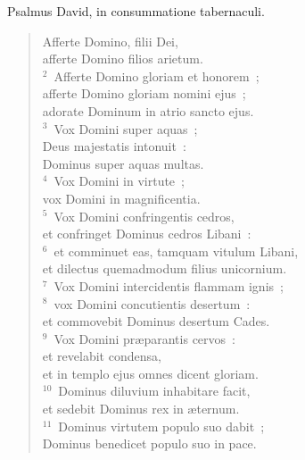 


\bchapter
\lettrine[lines=3,image=true,loversize=0.05,lraise=-0.03]{P}{}salmus David, in consummatione tabernaculi. \begin{flushleft}\begin{verse}\vspace{6pt}Afferte Domino, filii Dei,\\ afferte Domino filios arietum.\\
${}^{2}$~Afferte Domino gloriam et honorem~;\\ afferte Domino gloriam nomini ejus~;\\ adorate Dominum in atrio sancto ejus.\\
${}^{3}$~Vox Domini super aquas~;\\ Deus majestatis intonuit~:\\ Dominus super aquas multas.\\
${}^{4}$~Vox Domini in virtute~;\\ vox Domini in magnificentia.\\
${}^{5}$~Vox Domini confringentis cedros,\\ et confringet Dominus cedros Libani~:\\
${}^{6}$~et comminuet eas, tamquam vitulum Libani,\\ et dilectus quemadmodum filius unicornium.\\
${}^{7}$~Vox Domini intercidentis flammam ignis~;\\
${}^{8}$~vox Domini concutientis desertum~:\\ et commovebit Dominus desertum Cades.\\
${}^{9}$~Vox Domini pr\ae parantis cervos~:\\ et revelabit condensa,\\ et in templo ejus omnes dicent gloriam.\\
${}^{10}$~Dominus diluvium inhabitare facit,\\ et sedebit Dominus rex in \ae ternum.\\
${}^{11}$~Dominus virtutem populo suo dabit~;\\ Dominus benedicet populo suo in pace.\end{verse}\end{flushleft}



